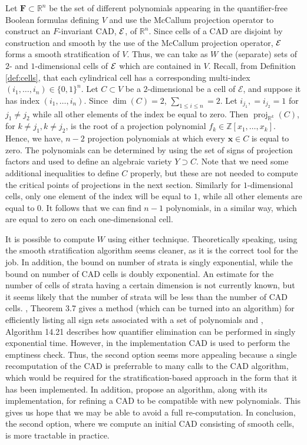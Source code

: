\documentclass[
]{book}
\theoremstyle{definition}
\theoremstyle{definition}
\theoremstyle{definition}
\theoremstyle{definition}
\theoremstyle{remark}
\begin{document}
Let \(\mathbf{F} \subset \mathbb{R}^n\) be the set of different polynomials appearing in the quantifier-free Boolean formulas defining \(V\) and use the McCallum projection operator to construct an \(F\)-invariant CAD, \(\cal E\), of \(\mathbb{R}^n\). Since cells of a CAD are disjoint by construction and smooth by the use of the McCallum projection operator, \(\cal E\) forms a smooth stratification of \(V\).
Thus, we can take as \(W\) the (separate) sets of \(2\)- and \(1\)-dimensional cells of \(\cal E\) which are contained in \(V\).
Recall, from Definition \ref{def:cells}, that each cylindrical cell has a corresponding multi-index \((i_1,\ldots,i_n) \in \{0,1\}^n\).
Let \(C \subset V\) be a \(2\)-dimensional be a cell of \(\mathcal{E}\), and suppose it has index \((i_1,\ldots,i_n)\). Since \(\dim(C) = 2\), \(\sum_{1\le i \le n} = 2\). Let \(i_{j_1}, = i_{j_2} = 1\) for \(j_1 \ne j_2\) while all other elements of the index be equal to zero. Then \({\operatorname{proj}_{\mathbb{R}^{k}}}(C)\), for \(k\ne j_1,k\ne j_2\), is the root of a projection polynomial \(f_k \in \mathbb{Z}[x_1,\ldots,x_k]\). Hence, we have, \(n-2\) projection polynomials at which every \(\mathbf{x} \in C\) is equal to zero.
The polynomials can be determined by using the set of signs of projection factors and used to define an algebraic variety \(Y \supset C\). Note that we need some additional inequalities to define \(C\) properly, but these are not needed to compute the critical points of projections in the next section.
Similarly for \(1\)-dimensional cells, only one element of the index will be equal to \(1\), while all other elements are equal to \(0\). It follows that we can find \(n-1\) polynomials, in a similar way, which are equal to zero on each one-dimensional cell.

It is possible to compute \(W\) using either technique. Theoretically speaking, using the smooth stratification algorithm seems cleaner, as it is the correct tool for the job. In addition, the bound on number of strata is singly exponential, while the bound on number of CAD cells is doubly exponential. An estimate for the number of cells of strata having a certain dimension is not currently known, but it seems likely that the number of strata will be less than the number of CAD cells.
\citet{gv04}, Theorem 3.7 gives a method (which can be turned into an algorithm) for efficiently listing all sign sets associated with a set of polynomials and \citet{bpr2006}, Algorithm 14.21 describes how quantifier elimination can be performed in singly exponential time.
However, in the implementation
CAD is used to perform the emptiness check. Thus, the second option seems more appealing because a single recomputation of the CAD is preferrable to many calls to the CAD algorithm, which would be required for the stratification-based approach in the form that it has been implemented.
In addition, \citet{kremer2020} propose an algorithm, along with its implementation, for refining a CAD to be compatible with new polynomials. This gives us hope that we may be able to avoid a full re-computation. In conclusion, the second option, where we compute an initial CAD consisting of smooth cells, is more tractable in practice.
\end{document}
